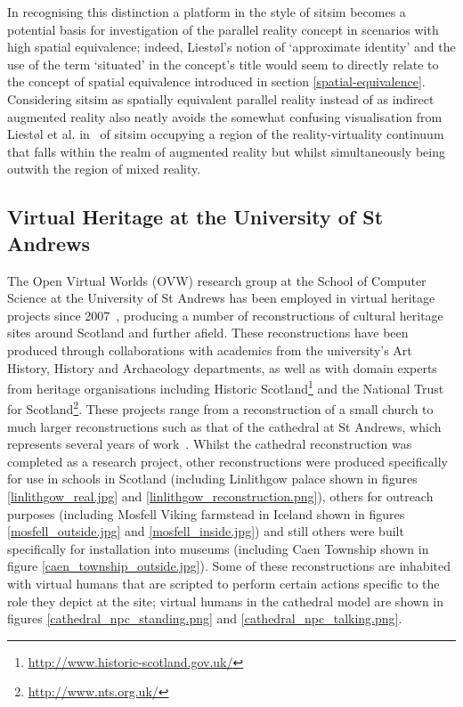 In recognising this distinction a platform in the style of sitsim becomes a potential basis for investigation of the parallel reality concept in scenarios with high spatial equivalence; indeed, Liest\o l's notion of `approximate identity' and the use of the term `situated' in the concept's title would seem to directly relate to the concept of spatial equivalence introduced in section \ref{spatial-equivalence}. Considering sitsim as spatially equivalent parallel reality instead of as indirect augmented reality also neatly avoids the somewhat confusing visualisation from Liest\o l et al. in~\cite{Liestøl2011} of sitsim occupying a region of the reality-virtuality continuum that falls within the realm of augmented reality but whilst simultaneously being outwith the region of mixed reality.



\subsection{Virtual Heritage at the University of St Andrews}

\label{virtual-heritage-at-st-andrews}


The Open Virtual Worlds (OVW) research group at the School of Computer Science at the University of St Andrews has been employed in virtual heritage projects since 2007~\cite{Getchell2007}, producing a number of reconstructions of cultural heritage sites around Scotland and further afield. These reconstructions have been produced through collaborations with academics from the university's Art History, History and Archaeology departments, as well as with domain experts from heritage organisations including Historic Scotland\footnote{\url{http://www.historic-scotland.gov.uk/}} and the National Trust for Scotland\footnote{\url{http://www.nts.org.uk/}}. These projects range from a reconstruction of a small church to much larger reconstructions such as that of the cathedral at St Andrews, which represents several years of work~\cite{Kennedy2013}. Whilst the cathedral reconstruction was completed as a research project, other reconstructions were produced specifically for use in schools in Scotland (including Linlithgow palace shown in figures \ref{linlithgow_real.jpg} and \ref{linlithgow_reconstruction.png}), others for outreach purposes (including Mosfell Viking farmstead in Iceland shown in figures \ref{mosfell_outside.jpg} and \ref{mosfell_inside.jpg}) and still others were built specifically for installation into museums (including Caen Township shown in figure  \ref{caen_township_outside.jpg}). Some of these reconstructions are inhabited with virtual humans that are scripted to perform certain actions specific to the role they depict at the site; virtual humans in the cathedral model are shown in figures \ref{cathedral_npc_standing.png} and \ref{cathedral_npc_talking.png}.

